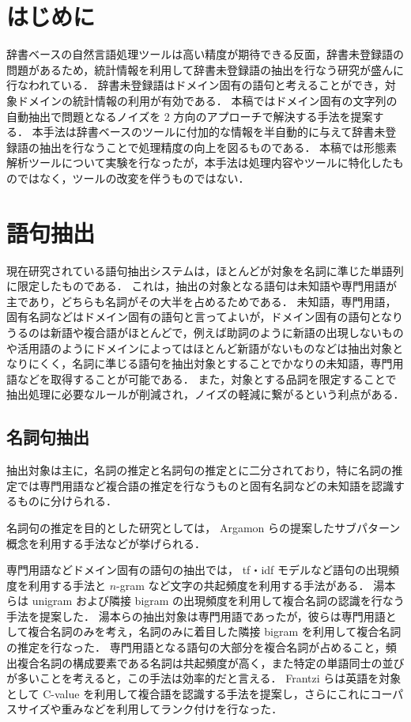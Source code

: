 \maketitle
\section{はじめに}
辞書ベースの自然言語処理ツールは高い精度が期待できる反面，辞書未登録語の問題があるため，統計情報を利用して辞書未登録語の抽出を行なう研究が盛んに行なわれている．
辞書未登録語はドメイン固有の語句と考えることができ，対象ドメインの統計情報の利用が有効である．
本稿ではドメイン固有の文字列の自動抽出で問題となるノイズを 2 方向のアプローチで解決する手法を提案する．
本手法は辞書ベースのツールに付加的な情報を半自動的に与えて辞書未登録語の抽出を行なうことで処理精度の向上を図るものである．
本稿では形態素解析ツールについて実験を行なったが，本手法は処理内容やツールに特化したものではなく，ツールの改変を伴うものではない．
\section{語句抽出}
現在研究されている語句抽出システムは，ほとんどが対象を名詞に準じた単語列に限定したものである．
これは，抽出の対象となる語句は未知語や専門用語が主であり，どちらも名詞がその大半を占めるためである．
未知語，専門用語，固有名詞などはドメイン固有の語句と言ってよいが，ドメイン固有の語句となりうるのは新語や複合語がほとんどで，例えば助詞のように新語の出現しないものや活用語のようにドメインによってはほとんど新語がないものなどは抽出対象となりにくく，名詞に準じる語句を抽出対象とすることでかなりの未知語，専門用語などを取得することが可能である．
また，対象とする品詞を限定することで抽出処理に必要なルールが削減され，ノイズの軽減に繋がるという利点がある．
\subsection{名詞句抽出}
抽出対象は主に，名詞の推定と名詞句の推定とに二分されており，特に名詞の推定では専門用語など複合語の推定を行なうものと固有名詞などの未知語を認識するものに分けられる．

名詞句の推定を目的とした研究としては， Argamon らの提案したサブパターン概念を利用する手法\cite{argamon98}などが挙げられる．

専門用語などドメイン固有の語句の抽出では， tf・idf モデルなど語句の出現頻度を利用する手法と $n$-gram など文字の共起頻度を利用する手法がある．
湯本らは unigram および隣接 bigram の出現頻度を利用して複合名詞の認識を行なう手法を提案した\cite{yumoto01ipsjnl}．
湯本らの抽出対象は専門用語であったが，彼らは専門用語として複合名詞のみを考え，名詞のみに着目した隣接 bigram を利用して複合名詞の推定を行なった．
専門用語となる語句の大部分を複合名詞が占めること，頻出複合名詞の構成要素である名詞は共起頻度が高く，また特定の単語同士の並びが多いことを考えると，この手法は効率的だと言える．
Frantzi らは英語を対象として C-value を利用して複合語を認識する手法を提案し，さらにこれにコーパスサイズや重みなどを利用してランク付けを行なった\cite{frantzi97}．

